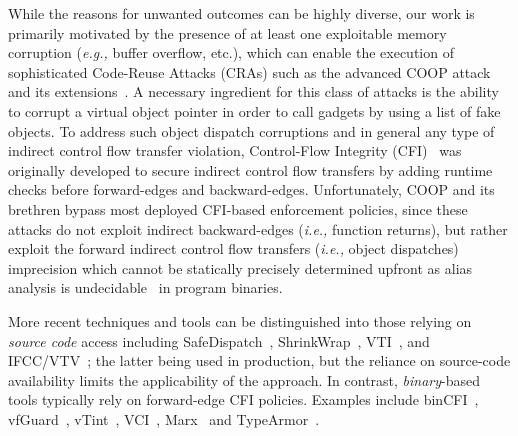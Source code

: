 While the reasons for unwanted outcomes can be highly diverse, our work is primarily motivated by the presence of at least one exploitable
memory corruption (\textit{e.g.,} buffer overflow, etc.), which can enable the execution of sophisticated Code-Reuse Attacks (CRAs) such as the advanced COOP attack~\cite{schuster:coop} and its 
extensions~\cite{crane:readactor++, subversive-c:lettner, ctf:coop, loop:oriented}. A necessary ingredient for this class of attacks is the ability
to corrupt a virtual object pointer in order to call gadgets by using a list of fake objects.
To address such object dispatch corruptions
and in general any type of indirect control flow transfer violation, Control-Flow Integrity (CFI)~\cite{abadi:cfi2, abadi:cfi} was originally developed to secure indirect control flow transfers by adding 
runtime checks before forward-edges and backward-edges. Unfortunately, COOP and its brethren bypass most deployed CFI-based enforcement policies, since 
these attacks do not exploit indirect backward-edges (\textit{i.e.,} function returns), but rather exploit the forward indirect control flow transfers (\textit{i.e.,} object dispatches)
imprecision which cannot be statically precisely determined upfront as alias analysis is undecidable~\cite{alias:undecidable} in program binaries.

More recent techniques and tools can be distinguished into those relying on \textit{source code} access including SafeDispatch~\cite{safedispatch:jang}, ShrinkWrap~\cite{haller:shrinkwrap}, 
VTI~\cite{bounov:interleaving}, and IFCC/VTV~\cite{vtv:tice}; the latter being used in production, but the reliance on source-code availability limits the applicability of the approach. 
In contrast, \textit{binary}-based tools typically rely on forward-edge CFI policies. Examples include binCFI~\cite{ccfir:zhang, zhang:usenix}, vfGuard~\cite{vfuard:aravind}, vTint~\cite{vtint:zhang}, 
VCI~\cite{vci:asiaccs}, Marx~\cite{marx} and TypeArmor~\cite{veen:typearmor}. 

